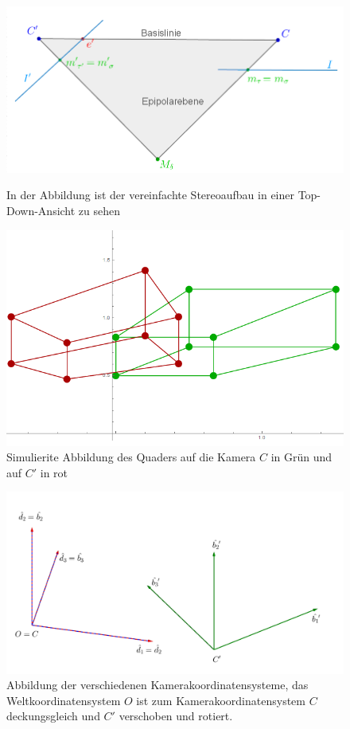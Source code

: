 \begin{figure}[!htb]
	\includegraphics[width=\linewidth]{images/SynthetischesBeispielAufbauTopDown_beschriftet.png}
	\caption[Synthetisches Beispiel Top-Down-Ansicht]{In der Abbildung ist der vereinfachte Stereoaufbau in einer Top-Down-Ansicht zu sehen}
	\label{fig:aufbauMinimalTopDown}
	\endminipage\hfill
	\includegraphics[width=\linewidth]{images/QuadrateMinimalBeispiel.png}
	\caption[Simulierte Abbildung eines Quaders auf zwei Kameras]{Simulierite Abbildung des Quaders auf die Kamera $C$ in Grün und auf $C'$ in rot}
	\label{fig:AbbildungenMinimal}
	\endminipage\hfill
\end{figure}

\begin{figure}[!htb]
	\centering
	\includegraphics[width=.6\linewidth]{images/KS_Minimalbeispiel_beschriftet.png}
	\caption[Koordinatensysteme von $C$ und $C'$]{Abbildung der verschiedenen Kamerakoordinatensysteme, das Weltkoordinatensystem  $O$ ist zum Kamerakoordinatensystem $C$ deckungsgleich und $C'$  verschoben und rotiert.}
	\label{fig:KoordsystemeMinimal}
\end{figure}

